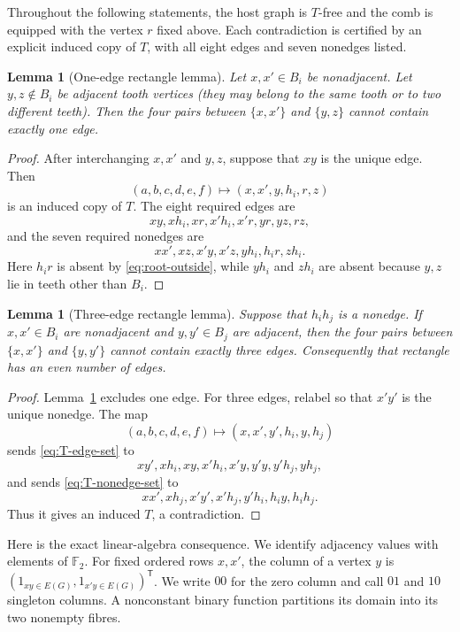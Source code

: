 \documentclass[11pt]{article}
\numberwithin{equation}{section}
\theoremstyle{plain}
\newtheorem{lemma}[theorem]{Lemma}
\theoremstyle{definition}
\begin{document}
Throughout the following statements, the host graph is $T$-free and
the comb is equipped with the vertex $r$ fixed above.  Each
contradiction is certified by an explicit induced copy of $T$, with all
eight edges and seven nonedges listed.

\begin{lemma}[One-edge rectangle lemma]
\label{lem:f124-one-edge-rectangle}
Let $x,x'\in B_i$ be nonadjacent.  Let $y,z\notin B_i$ be adjacent tooth
vertices (they may belong to the same tooth or to two different teeth).
Then the four pairs between $\{x,x'\}$ and $\{y,z\}$ cannot contain
exactly one edge.
\end{lemma}

\begin{proof}
After interchanging $x,x'$ and $y,z$, suppose that $xy$ is the unique
edge.  Then
\begin{equation*}
 (a,b,c,d,e,f)\longmapsto(x,x',y,h_i,r,z)
\end{equation*}
is an induced copy of $T$.  The eight required edges are
\[
 xy,xh_i,xr,x'h_i,x'r,yr,yz,rz,
\]
and the seven required nonedges are
\[
 xx',xz,x'y,x'z,yh_i,h_ir,zh_i.
\]
Here $h_ir$ is absent by \eqref{eq:root-outside}, while $yh_i$ and
$zh_i$ are absent because $y,z$ lie in teeth other than $B_i$.
\end{proof}

\begin{lemma}[Three-edge rectangle lemma]
\label{lem:f124-three-edge-rectangle}
Suppose that $h_ih_j$ is a nonedge.  If $x,x'\in B_i$ are nonadjacent
and $y,y'\in B_j$ are adjacent, then the four pairs between
$\{x,x'\}$ and $\{y,y'\}$ cannot contain exactly three edges.
Consequently that rectangle has an even number of edges.
\end{lemma}

\begin{proof}
Lemma~\ref{lem:f124-one-edge-rectangle} excludes one edge.  For three
edges, relabel so that $x'y'$ is the unique nonedge.  The map
\begin{equation*}
 (a,b,c,d,e,f)\longmapsto(x,x',y',h_i,y,h_j)
\end{equation*}
sends \eqref{eq:T-edge-set} to
\[
 xy',xh_i,xy,x'h_i,x'y,y'y,y'h_j,yh_j,
\]
and sends \eqref{eq:T-nonedge-set} to
\[
 xx',xh_j,x'y',x'h_j,y'h_i,h_iy,h_ih_j.
\]
Thus it gives an induced $T$, a contradiction.
\end{proof}

Here is the exact linear-algebra consequence.  We identify adjacency
values with elements of $\mathbb F_2$.  For fixed ordered rows $x,x'$,
the column of a vertex $y$ is
$(1_{xy\in E(G)},1_{x'y\in E(G)})^{\mathsf T}$.  We write $00$ for the
zero column and call $01$ and $10$ singleton columns.  A nonconstant
binary function partitions its domain into its two nonempty fibres.
\end{document}
